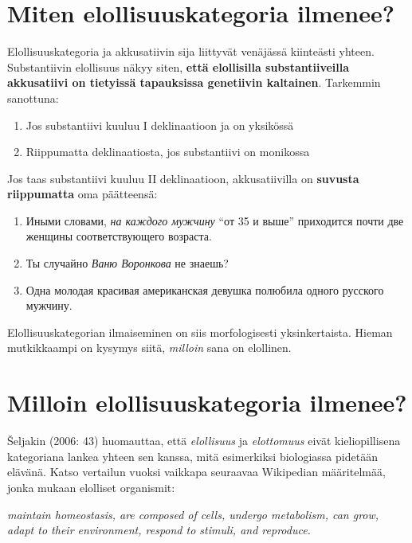 \documentclass[]{scrreprt}
\providecommand{\tightlist}{%
  \setlength{\itemsep}{0pt}\setlength{\parskip}{0pt}}
\begin{document}
\section{Miten elollisuuskategoria
ilmenee?}\label{miten-elollisuuskategoria-ilmenee}

Elollisuuskategoria ja akkusatiivin sija liittyvät venäjässä kiinteästi
yhteen. Substantiivin elollisuus näkyy siten, \textbf{että elollisilla
substantiiveilla akkusatiivi on tietyissä tapauksissa genetiivin
kaltainen}. Tarkemmin sanottuna:

\begin{enumerate}
\def\labelenumi{\arabic{enumi}.}
\tightlist
\item
  Jos substantiivi kuuluu I deklinaatioon ja on yksikössä
\item
  Riippumatta deklinaatiosta, jos substantiivi on monikossa
\end{enumerate}

Jos taas substantiivi kuuluu II deklinaatioon, akkusatiivilla on
\textbf{suvusta riippumatta} oma päätteensä:

\begin{enumerate}
\def\labelenumi{(\arabic{enumi})}
\setcounter{enumi}{107}
\tightlist
\item
  Иными словами, \emph{на каждого мужчину} ``от 35 и выше'' приходится
  почти две женщины соответствующего возраста.
\item
  Ты случайно \emph{Ваню Воронкова} не знаешь?
\item
  Одна молодая красивая американская девушка полюбила одного русского
  мужчину.
\end{enumerate}

Elollisuuskategorian ilmaiseminen on siis morfologisesti yksinkertaista.
Hieman mutkikkaampi on kysymys siitä, \emph{milloin} sana on elollinen.

\section{Milloin elollisuuskategoria
ilmenee?}\label{milloin-elollisuuskategoria-ilmenee}

Šeljakin (2006: 43) huomauttaa, että \emph{elollisuus} ja
\emph{elottomuus} eivät kieliopillisena kategoriana lankea yhteen sen
kanssa, mitä esimerkiksi biologiassa pidetään elävänä. Katso vertailun
vuoksi vaikkapa seuraavaa Wikipedian määritelmää, jonka mukaan elolliset
organismit:

\emph{maintain homeostasis, are composed of cells, undergo metabolism,
can grow, adapt to their environment, respond to stimuli, and
reproduce.}
\end{document}
